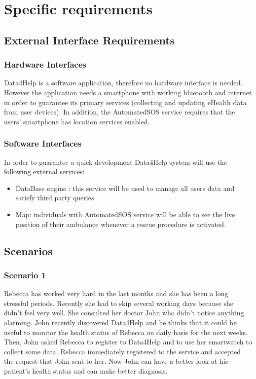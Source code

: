 \chapter{Specific requirements}

\section{External Interface Requirements}


\subsection{Hardware Interfaces}
Data4Help is a software application, therefore no hardware interface is needed. However the application needs a smartphone with working bluetooth and internet in order to guarantee its primary services (collecting and updating eHealth data from user devices). 
In addition, the AutomatedSOS service requires that the users' smartphone has location services enabled.


\subsection{Software Interfaces}
In order to guarantee a quick development Data4Help system will use the following external services:
\begin{itemize}
\item DataBase engine : this service will be used to manage all users data and satisfy third party queries
\item Map: individuals with AutomatedSOS service will be able to see the live position of their ambulance whenever a rescue procedure is activated.
\end{itemize}

\section{Scenarios}
\subsection{Scenario 1}

Rebecca has worked very hard in the last months and she has been a long stressful periods. Recently she had to skip several working days because she didn't feel very well. 
She consulted her doctor John who didn't notice anything alarming.
John recently discovered Data4Help and he thinks that it could be useful to monitor the health status of Rebecca on daily basis for the next weeks.
Then, John asked Rebecca to register to Data4Help and to use her smartwatch to collect some data.
Rebecca immediately registered to the service and accepted the request that John sent to her.
Now John can have a better look at his patient's health status and can make better diagnosis.



